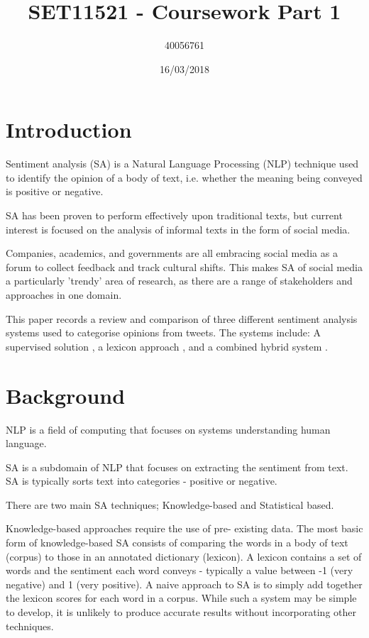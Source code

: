 \documentclass[twocolumn]{article}
\begin{document}
\title{SET11521 - Coursework Part 1}
\author{40056761}
\date{16/03/2018}
\maketitle

\section{Introduction}
Sentiment analysis (SA) is a Natural Language Processing (NLP)
technique used to identify the opinion of a
body of text, i.e. whether the meaning being conveyed is positive or negative.

SA has been proven to perform effectively upon traditional
texts, but current interest is focused on the analysis of informal texts in
the form of social media.

Companies, academics, and governments are all embracing social media as a forum
to collect feedback and track cultural shifts. 
This makes SA of social media a particularly 'trendy' area of
research, as there are a range of stakeholders and approaches in one domain.

This paper records a review and comparison of three different sentiment
analysis systems used to categorise opinions from tweets.
The systems include: A supervised solution \cite{Kaur2015}, a lexicon
approach \cite{Muhammad2016}, and a combined hybrid system
\cite{Asghar2017}.

\section{Background}
NLP is a field of computing that focuses on systems understanding human
language.  

SA is a subdomain of NLP that focuses on extracting the sentiment from text.
SA is typically sorts text into categories - positive or negative.

There are two main SA techniques;
Knowledge-based and Statistical based.

Knowledge-based approaches require the use of pre- existing data.
The most basic form of knowledge-based SA consists of
comparing the words in a body of text (corpus) to those in an annotated
dictionary (lexicon).
A lexicon contains a set of words and the sentiment each word conveys -
typically a value between -1 (very negative) and 1 (very positive).
A naive approach to SA is to simply add together the lexicon
scores for each word in a corpus.
While such a system may be simple to develop, it is unlikely to produce
accurate results without incorporating other techniques.
\end{document}
